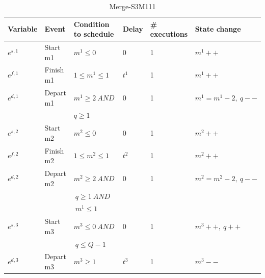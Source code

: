 \documentclass[]{interact}
\theoremstyle{plain}%
\theoremstyle{definition}
\theoremstyle{remark}
\begin{document}
\begin{table}[h]
	\begin{tabular}{|llllll|}\hline
		Variable&Event & Condition to schedule & Delay&\# executions& State change\\\hline
		$e^{s,1}$&Start m1 	& $m^1\le 0$ & $0$&1& $m^1++$ \\\hline
		$e^{f,1}$&Finish m1 & $1\le m^1\le 1$ 	& $t^1$ &1& $m^1++$\\\hline
		$e^{d,1}$&Depart m1& $m^1\ge2\ AND$&$0$ &1 & $m^1 = m^1-2,\ q--$\\
											&&$ q\ge 1$ &&&\\\hline
		$e^{s,2}$&Start m2 	& $m^2\le 0$ & $0$ &1& $m^2++$ \\	\hline
		$e^{f,2}$&Finish m2 & $1\le m^2\le 1$ 	& $t^2$ &1 & $m^2++$\\\hline
		$e^{d,2}$&Depart m2& $m^2\ge2\ AND$&$0$  &1& $m^2=m^2-2,\ q--$\\
						&&$\ q\ge 1\ AND$&&&\\
						&&$\ m^1\le 1 $ & &&\\\hline
		$e^{s,3}$& Start m3 & $m^3 \le 0\ AND$&$0$  &1& $m^3++,\ q++$\\
						&&$\ q\le Q-1$ & &&\\\hline
		$e^{d,3}$& Depart m3 & $m^3 \ge 1$ & $t^3$  &1& $m^3--$\\\hline
	\end{tabular}
	\caption{Merge-S3M111}
\end{table}
\end{document}
